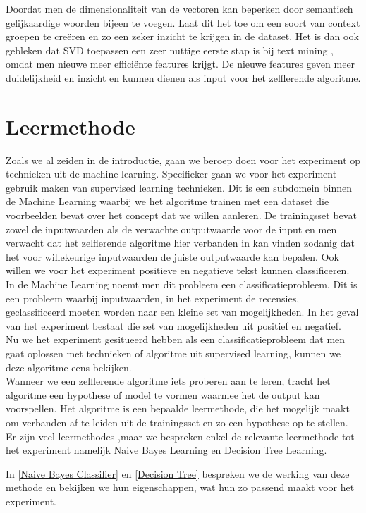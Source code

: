 Doordat men de dimensionaliteit van de vectoren kan beperken door semantisch gelijkaardige woorden bijeen te voegen. Laat dit het toe om een soort van context groepen te cre\"eren en zo een zeker inzicht te krijgen in de dataset. Het is dan ook gebleken dat SVD toepassen een zeer nuttige eerste stap is bij text mining \cite{maas2011learning}, omdat men nieuwe meer effici\"ente features krijgt. De nieuwe features geven meer duidelijkheid en inzicht en kunnen dienen als input voor het zelflerende algoritme.

\section{Leermethode}\label{Leermethode}

Zoals we al zeiden in de introductie, gaan we beroep doen voor het experiment op technieken uit de machine learning. Specifieker gaan we voor het experiment gebruik maken van supervised learning technieken.
Dit is een subdomein binnen de Machine Learning waarbij we het algoritme trainen met een dataset die voorbeelden bevat over het concept dat we willen aanleren. De trainingsset bevat zowel de inputwaarden als de verwachte outputwaarde voor de input en men verwacht dat het zelflerende algoritme hier verbanden in kan vinden zodanig dat het voor willekeurige inputwaarden de juiste outputwaarde kan bepalen. Ook willen we voor het experiment positieve en negatieve tekst kunnen classificeren. In de Machine Learning noemt men dit probleem een classificatieprobleem. Dit is een probleem waarbij inputwaarden, in het experiment de recensies, geclassificeerd moeten worden naar een kleine set van mogelijkheden. In het geval van het experiment bestaat die set van mogelijkheden uit positief en negatief.\\
%
Nu we het experiment gesitueerd hebben als een classificatieprobleem dat men gaat oplossen met technieken of algoritme uit supervised learning, kunnen we deze algoritme eens bekijken.\\  
%
Wanneer we een zelflerende algoritme iets proberen aan te leren, tracht het algoritme een hypothese of model te vormen waarmee het de output kan voorspellen. Het algoritme is een bepaalde leermethode, die het mogelijk maakt om verbanden af te leiden uit de trainingsset en zo een hypothese op te stellen.
Er zijn veel leermethodes \cite{mitchell1997machine},maar we bespreken enkel de relevante leermethode tot het experiment namelijk Naive Bayes Learning en Decision Tree Learning.

In \ref{Naive Bayes Classifier} en \ref{Decision Tree} bespreken we de werking van deze methode en bekijken we hun eigenschappen, wat hun zo passend maakt voor het experiment.  


